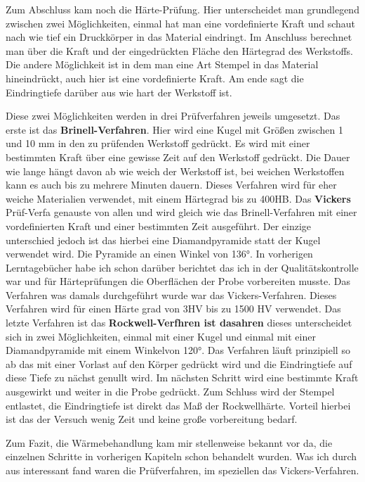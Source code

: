 \documentclass[12pt]{scrreprt}
\begin{document}
Zum Abschluss kam noch die Härte-Prüfung. Hier unterscheidet man grundlegend zwischen zwei Möglichkeiten, einmal hat man eine vordefinierte Kraft und schaut nach wie tief ein Druckkörper in das Material eindringt. Im Anschluss berechnet man über die Kraft und der eingedrückten Fläche den Härtegrad des Werkstoffs.
Die andere Möglichkeit ist in dem man eine Art Stempel in das Material hineindrückt, auch hier ist eine vordefinierte Kraft. Am ende sagt die Eindringtiefe darüber aus wie hart der Werkstoff ist.\par\smallskip
Diese zwei Möglichkeiten werden in drei Prüfverfahren jeweils umgesetzt. Das erste ist das \textbf{Brinell-Verfahren}. Hier wird eine Kugel mit Größen zwischen 1 und 10 mm in den zu  prüfenden Werkstoff gedrückt. Es wird mit einer bestimmten Kraft über eine gewisse Zeit auf den Werkstoff gedrückt. Die Dauer wie lange hängt davon ab wie weich der Werkstoff ist, bei weichen Werkstoffen kann es auch bis zu mehrere Minuten dauern. Dieses Verfahren wird für eher weiche Materialien verwendet, mit einem Härtegrad bis zu 400HB.
Das \textbf{Vickers} Prüf-Verfa genauste von allen und wird gleich wie das Brinell-Verfahren mit einer vordefinierten Kraft und einer bestimmten Zeit ausgeführt. Der einzige unterschied jedoch ist das hierbei eine Diamandpyramide statt der Kugel verwendet wird. Die Pyramide an einen Winkel von  136°. 
In vorherigen Lerntagebücher habe ich schon darüber berichtet das ich in der Qualitätskontrolle war und für Härteprüfungen die Oberflächen der Probe vorbereiten musste. Das Verfahren was damals durchgeführt wurde war das Vickers-Verfahren. 
Dieses Verfahren wird für einen Härte grad von 3HV bis zu 1500 HV verwendet.
Das letzte Verfahren ist das \textbf{Rockwell-Verfhren ist dasahren} dieses unterscheidet sich in zwei Möglichkeiten, einmal mit einer Kugel und einmal mit einer Diamandpyramide mit einem Winkelvon 120°. Das Verfahren läuft prinzipiell so ab das mit einer Vorlast auf den Körper gedrückt wird und die Eindringtiefe auf diese Tiefe zu nächst genullt wird. 
Im nächsten Schritt wird eine bestimmte Kraft ausgewirkt und weiter in die Probe gedrückt. Zum Schluss wird der Stempel entlastet, die Eindringtiefe ist direkt das Maß der Rockwellhärte. Vorteil hierbei ist das der Versuch wenig Zeit und keine große vorbereitung bedarf.\par\bigskip

Zum Fazit, die Wärmebehandlung kam mir stellenweise bekannt vor da, die einzelnen Schritte in vorherigen Kapiteln schon behandelt wurden. Was ich durch aus interessant fand waren die Prüfverfahren, im speziellen das Vickers-Verfahren.
\end{document}
